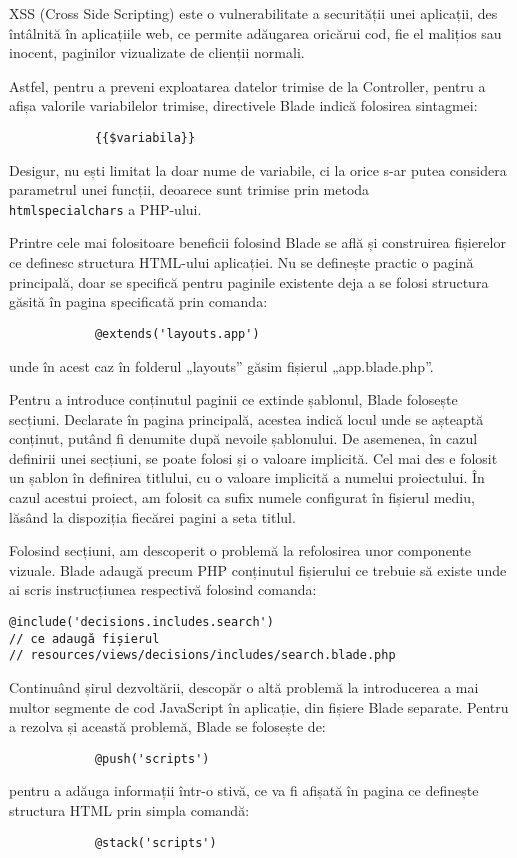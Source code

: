 		XSS (Cross Side Scripting) este o vulnerabilitate a securității unei aplicații, des întâlnită în aplicațiile web, ce permite adăugarea oricărui cod, fie el malițios sau inocent, paginilor vizualizate de clienții normali.

		Astfel, pentru a preveni exploatarea datelor trimise de la Controller, pentru a afișa valorile variabilelor trimise, directivele Blade indică folosirea sintagmei:
			\begin{Verbatim}
			{{$variabila}}
			\end{Verbatim}

		Desigur, nu ești limitat la doar nume de variabile, ci la orice s-ar putea considera parametrul unei funcții, deoarece sunt trimise prin metoda \\
		\verb|htmlspecialchars| a PHP-ului.

		Printre cele mai folositoare beneficii folosind Blade se află și construirea fișierelor ce definesc structura HTML-ului aplicației.
		Nu se definește practic o pagină principală, doar se specifică pentru paginile existente deja a se folosi structura găsită în pagina specificată prin comanda:
		\begin{Verbatim}
			@extends('layouts.app')
		\end{Verbatim}
		unde în acest caz în folderul „layouts” găsim fișierul „app.blade.php”.

		Pentru a introduce conținutul paginii ce extinde șablonul, Blade folosește secțiuni.
		Declarate în pagina principală, acestea indică locul unde se așteaptă conținut, putând fi denumite după nevoile șablonului.
		De asemenea, în cazul definirii unei secțiuni, se poate folosi și o valoare implicită.
		Cel mai des e folosit un șablon în definirea titlului, cu o valoare implicită a numelui proiectului.
		În cazul acestui proiect, am folosit ca sufix numele configurat în fișierul mediu, lăsând la dispoziția fiecărei pagini a seta titlul.

		Folosind secțiuni, am descoperit o problemă la refolosirea unor componente vizuale.
		Blade adaugă precum PHP conținutul fișierului ce trebuie să existe unde ai scris instrucțiunea respectivă folosind comanda:
		\begin{Verbatim}
@include('decisions.includes.search')
// ce adaugă fișierul
// resources/views/decisions/includes/search.blade.php
		\end{Verbatim}

		Continuând șirul dezvoltării, descopăr o altă problemă la introducerea a mai multor segmente de cod JavaScript în aplicație, din fișiere Blade separate.
		Pentru a rezolva și această problemă, Blade se folosește de:
		\begin{Verbatim}
			@push('scripts')
		\end{Verbatim}
		pentru a adăuga informații într-o stivă, ce va fi afișată în pagina ce definește structura HTML prin simpla comandă:
		\begin{Verbatim}
			@stack('scripts')
		\end{Verbatim}

